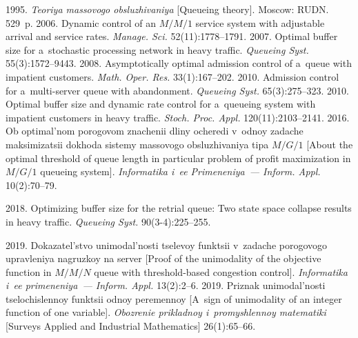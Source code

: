  \begin{multicols}{2}

\renewcommand{\bibname}{\protect\rmfamily References}

{\small\frenchspacing
 {%
 \begin{thebibliography}{99}
   
    1995. \textit{Teoriya massovogo obsluzhivaniya} 
[Queueing theory]. Moscow: RUDN. 529~p.
    2006. Dynamic control of an $M/M/1$ service system with adjustable 
arrival and service rates. \textit{Manage. Sci.} 52(11):1778--1791.
    2007. Optimal buffer size for a~stochastic processing 
network in heavy traffic. \textit{Queueing Syst.} 55(3):1572--9443.
    2008. Asymptotically optimal admission control of a~queue with 
impatient customers. \textit{Math. Oper. Res.} 33(1):167--202.
    2010. 
Admission control for 
a~multi-server queue with abandonment. \textit{Queueing Syst.} 65(3):275--323.
    2010. Optimal buffer 
size and dynamic rate control for a~queueing system with impatient customers 
in heavy traffic. \textit{Stoch. Proc. Appl.} 120(11):2103--2141. 
    2016. 
Ob optimal'nom porogovom znachenii dliny ocheredi v~odnoy zadache maksimizatsii dokhoda 
sistemy massovogo obsluzhivaniya tipa $M/G/1$ [About the optimal 
threshold of queue length in particular problem of profit maximization in $M/G/1$ 
queueing system]. 
\textit{Informatika i~ee Primeneniya~--- Inform. Appl.} 10(2):70--79.
   
 2018. Optimizing buffer size for the 
retrial queue: Two state space collapse results in heavy traffic. 
\textit{Queueing Syst.} 90(3-4):225--255. 

    2019. Dokazatel'stvo unimodal'nosti tselevoy funktsii 
v~zadache porogovogo upravleniya nagruzkoy na server [Proof of the unimodality of the objective function 
in $M/M/N$ queue with threshold-based congestion control]. \textit{Informatika i~ee primeneniya~--- Inform. 
Appl.} 13(2):2--6. 
    2019. Priznak unimodal'nosti tselochislennoy funktsii odnoy peremennoy 
[A~sign of unimodality of an integer function of one variable]. \textit{Obozrenie prikladnoy 
i~promyshlennoy matematiki } [Surveys Applied and Industrial Mathematics] 26(1):65--66.
\end{thebibliography}

 }
 }

\end{multicols}

